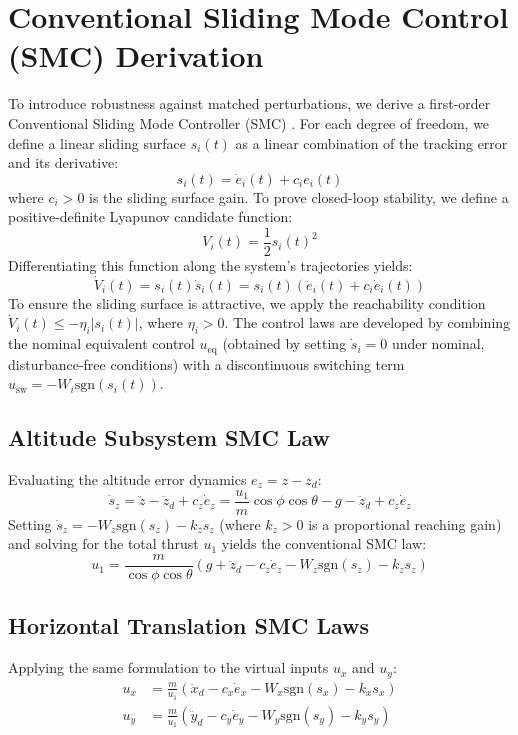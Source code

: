 \section{Conventional Sliding Mode Control (SMC) Derivation}
To introduce robustness against matched perturbations, we derive a first-order Conventional Sliding Mode Controller (SMC) \cite{ref_77}. For each degree of freedom, we define a linear sliding surface $s_i(t)$ as a linear combination of the tracking error and its derivative:
\begin{equation}
s_i(t) = \dot{e}_i(t) + c_i e_i(t)
\end{equation}
where $c_i > 0$ is the sliding surface gain. To prove closed-loop stability, we define a positive-definite Lyapunov candidate function:
\begin{equation}
V_i(t) = \frac{1}{2} s_i(t)^2
\end{equation}
Differentiating this function along the system's trajectories yields:
\begin{equation}
\dot{V}_i(t) = s_i(t) \dot{s}_i(t) = s_i(t) (\ddot{e}_i(t) + c_i \dot{e}_i(t))
\end{equation}
To ensure the sliding surface is attractive, we apply the reachability condition $\dot{V}_i(t) \leq -\eta_i |s_i(t)|$, where $\eta_i > 0$. The control laws are developed by combining the nominal equivalent control $u_{\text{eq}}$ (obtained by setting $\dot{s}_i = 0$ under nominal, disturbance-free conditions) with a discontinuous switching term $u_{\text{sw}} = -W_i \text{sgn}(s_i(t))$.

\subsection{Altitude Subsystem SMC Law}
Evaluating the altitude error dynamics $e_z = z - z_d$:
\begin{equation}
\dot{s}_z = \ddot{z} - \ddot{z}_d + c_z \dot{e}_z = \frac{u_1}{m}\cos\phi\cos\theta - g - \ddot{z}_d + c_z \dot{e}_z
\end{equation}
Setting $\dot{s}_z = -W_z \text{sgn}(s_z) - k_z s_z$ (where $k_z > 0$ is a proportional reaching gain) and solving for the total thrust $u_1$ yields the conventional SMC law:
\begin{equation}
u_1 = \frac{m}{\cos\phi \cos\theta} \left( g + \ddot{z}_d - c_z \dot{e}_z - W_z \text{sgn}(s_z) - k_z s_z \right)
\end{equation}

\subsection{Horizontal Translation SMC Laws}
Applying the same formulation to the virtual inputs $u_x$ and $u_y$:
\begin{align}
u_x &= \frac{m}{u_1} \left( \ddot{x}_d - c_x \dot{e}_x - W_x \text{sgn}(s_x) - k_x s_x \right) \\
u_y &= \frac{m}{u_1} \left( \ddot{y}_d - c_y \dot{e}_y - W_y \text{sgn}(s_y) - k_y s_y \right)
\end{align}

